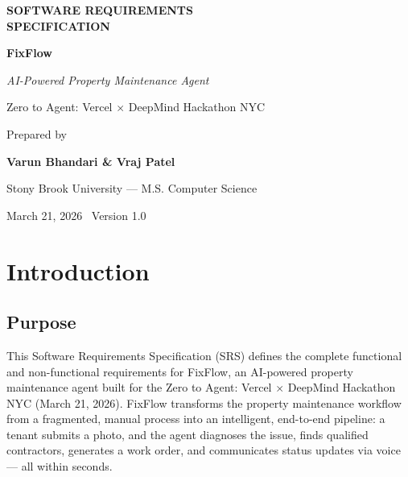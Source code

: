 \documentclass[12pt,a4paper]{article}
\begin{document}
\begin{titlepage}
    \centering
    \vspace*{3cm}
    {\Huge\bfseries SOFTWARE REQUIREMENTS\\[0.3cm] SPECIFICATION\par}
    \vspace{1.5cm}
    {\LARGE\bfseries FixFlow\par}
    \vspace{0.5cm}
    {\large\itshape AI-Powered Property Maintenance Agent\par}
    \vspace{1.5cm}
    {\large Zero to Agent: Vercel $\times$ DeepMind Hackathon NYC\par}
    \vspace{2cm}
    {\large Prepared by\par}
    \vspace{0.4cm}
    {\Large\bfseries Varun Bhandari \& Vraj Patel\par}
    \vspace{0.4cm}
    {\large Stony Brook University --- M.S. Computer Science\par}
    \vspace{2cm}
    {\large March 21, 2026 \textbar\ Version 1.0\par}
\end{titlepage}

\tableofcontents
\newpage

\section{Introduction}

\subsection{Purpose}

This Software Requirements Specification (SRS) defines the complete functional and non-functional requirements for FixFlow, an AI-powered property maintenance agent built for the Zero to Agent: Vercel $\times$ DeepMind Hackathon NYC (March 21, 2026). FixFlow transforms the property maintenance workflow from a fragmented, manual process into an intelligent, end-to-end pipeline: a tenant submits a photo, and the agent diagnoses the issue, finds qualified contractors, generates a work order, and communicates status updates via voice --- all within seconds.
\end{document}
